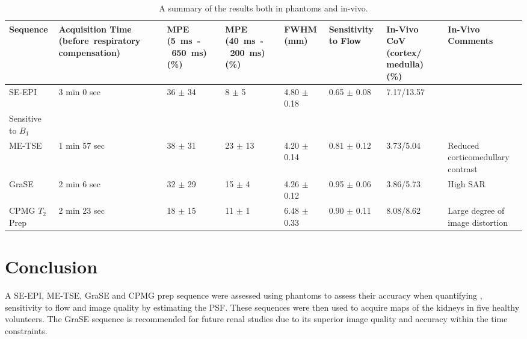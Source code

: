 \begin{table}[H]
	\centering
	\begin{adjustbox}{width=1.0\textwidth, center}
		\begin{tabularx}{1.6\textwidth}{X|X|X|X|X|X|X|X}
			Sequence        & Acquisition Time  \scriptsize{(before~respiratory compensation)} & MPE  (5~ms~-~650~ms) (\%) & MPE  (40~ms~-~200~ms) (\%) & FWHM (mm)       & Sensitivity to Flow & In-Vivo CoV (cortex/ medulla) (\%) & In-Vivo Comments                                                        \\ \hline
			SE-EPI          & 3 min 0 sec                                                      & 36 $\pm$ 34               & 8 $\pm$ 5                  & 4.80 $\pm$ 0.18 & 0.65 $\pm$  0.08    & 7.17/13.57                        & \begin{tabular}[c]{@{}l@{}}Inaccurate\\ Sensitive to $B_1$\end{tabular} \\ \hline
			ME-TSE          & 1 min 57 sec                                                     & 38 $\pm$ 31               & 23 $\pm$ 13                & 4.20 $\pm$ 0.14 & 0.81 $\pm$ 0.12     & 3.73/5.04                         & Reduced corticomedullary contrast                                       \\ \hline
			GraSE           & 2 min 6 sec                                                      & 32 $\pm$ 29               & 15 $\pm$ 4                 & 4.26 $\pm$ 0.12 & 0.95 $\pm$ 0.06     & 3.86/5.73                         & High SAR                                                                \\ \hline
			CPMG $T_2$ Prep & 2 min 23 sec                                                     & 18 $\pm$ 15               & 11 $\pm$ 1                 & 6.48 $\pm$ 0.33 & 0.90 $\pm$ 0.11     & 8.08/8.62                         & Large degree of image distortion                                  
		\end{tabularx}
	\end{adjustbox}
	\caption{A summary of the results both in phantoms and in-vivo.}
	\label{tab:t2_results_summary}
\end{table}

\section{Conclusion}

A \ac{SE}-\ac{EPI}, \ac{ME-TSE}, \ac{GraSE} and \ac{CPMG} \ttwo prep sequence were assessed using phantoms to assess their accuracy when quantifying \ttwo, sensitivity to flow and image quality by estimating the \ac{PSF}. These sequences were then used to acquire \ttwo maps of the kidneys in five healthy volunteers. The \ac{GraSE} sequence is recommended for future renal studies due to its superior image quality and accuracy within the time constraints.

